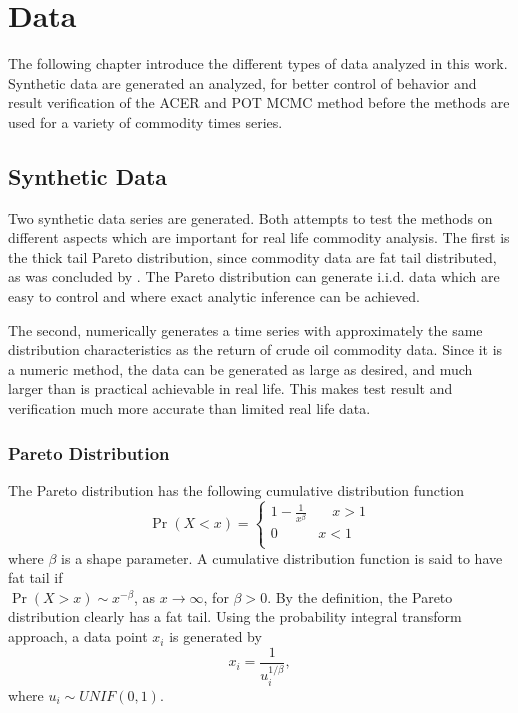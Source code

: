 \chapter[Data]{Data}
\label{ch:data}
The following chapter introduce the different types of data analyzed in this work. Synthetic data are generated an analyzed, for better control of behavior and result verification of the ACER and POT MCMC method before the methods are used for a variety of commodity times series.
\section{Synthetic Data}
Two synthetic data series are generated. Both attempts to test the methods on different aspects which are important for real life commodity analysis. The first is the thick tail Pareto distribution, since commodity data are fat tail distributed, as was concluded by \cite{fattail}.  The Pareto distribution can generate i.i.d. data which are easy to control and where exact analytic inference can be achieved. 

The second, numerically generates a time series with approximately the same distribution characteristics as the return of crude oil commodity data. Since it is a numeric method, the data can be generated as large as desired, and much larger than is practical achievable in real life. This makes test result and verification much more accurate than limited real life data.
\subsection{Pareto Distribution}
The Pareto distribution has the following cumulative distribution function
\begin{equation}
\label{eq:paretocdf}
\Pr(X<x)=
\begin{cases}
1-\frac{1}{x^\beta} & \quad x>1\\
0 & x<1\\
\end{cases}
\end{equation}
where $\beta$ is a shape parameter. A cumulative distribution function is said to have fat tail if \\$\Pr(X>x)\sim x^{-\beta}$, as $x \to \infty$,  for $\beta > 0$. By the definition, the Pareto distribution clearly has a fat tail.
Using the probability integral transform approach, a data point $x_i$ is generated by
\begin{equation}
x_i=\frac{1}{u_i^{1/\beta}},
\end{equation}
where $u_i \sim UNIF(0,1)$.

